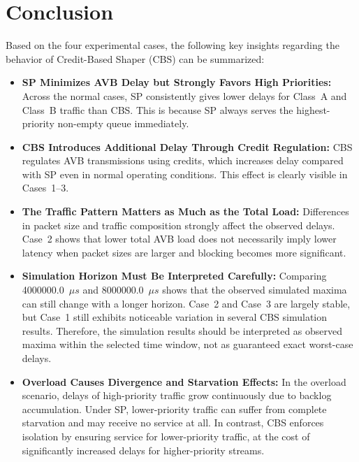 \section{Conclusion}

Based on the four experimental cases, the following key insights regarding the behavior of Credit-Based Shaper (CBS) can be summarized:

\begin{itemize}
\item \textbf{SP Minimizes AVB Delay but Strongly Favors High Priorities:}
Across the normal cases, SP consistently gives lower delays for Class~A and Class~B traffic than CBS. This is because SP always serves the highest-priority non-empty queue immediately.

\item \textbf{CBS Introduces Additional Delay Through Credit Regulation:}
CBS regulates AVB transmissions using credits, which increases delay compared with SP even in normal operating conditions. This effect is clearly visible in Cases~1--3.

\item \textbf{The Traffic Pattern Matters as Much as the Total Load:}
Differences in packet size and traffic composition strongly affect the observed delays. Case~2 shows that lower total AVB load does not necessarily imply lower latency when packet sizes are larger and blocking becomes more significant.

\item \textbf{Simulation Horizon Must Be Interpreted Carefully:}
Comparing 4000000.0~$\mu s$ and 8000000.0~$\mu s$ shows that the observed simulated maxima can still change with a longer horizon. Case~2 and Case~3 are largely stable, but Case~1 still exhibits noticeable variation in several CBS simulation results. Therefore, the simulation results should be interpreted as observed maxima within the selected time window, not as guaranteed exact worst-case delays.

\item \textbf{Overload Causes Divergence and Starvation Effects:}
In the overload scenario, delays of high-priority traffic grow continuously due to backlog accumulation. Under SP, lower-priority traffic can suffer from complete starvation and may receive no service at all. In contrast, CBS enforces isolation by ensuring service for lower-priority traffic, at the cost of significantly increased delays for higher-priority streams.
\end{itemize}
